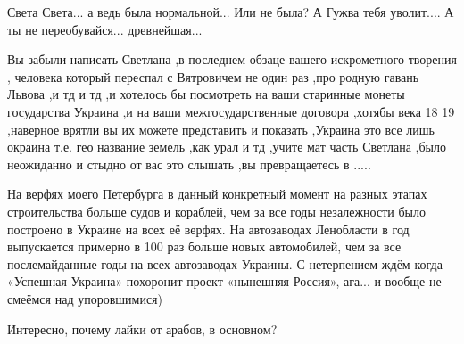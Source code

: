 \begin{itemize}
 

Света Света... а ведь была нормальной... Или не была? А Гужва тебя уволит.... А ты
не переобувайся... древнейшая...


 

Вы забыли написать Светлана ,в последнем обзаце вашего искрометного творения ,
человека который переспал с Вятровичем не один раз ,про родную гавань Львова ,и
тд и тд ,и хотелось бы посмотреть на ваши старинные монеты государства Украина
,и на ваши межгосударственные договора ,хотябы века 18 19 ,наверное врятли вы
их можете представить и показать ,Украина это все лишь окраина т.е. гео
название земель ,как урал и тд ,учите мат часть Светлана ,было неожиданно и
стыдно от вас это слышать ,вы превращаетесь в .....


 

На верфях моего Петербурга в данный конкретный момент на разных этапах
строительства больше судов и кораблей, чем за все годы незалежности было
построено в Украине на всех её верфях. На автозаводах Ленобласти в год
выпускается примерно в 100 раз больше новых автомобилей, чем за все
послемайданные годы на всех автозаводах Украины. С нетерпением ждём когда
«Успешная Украина» похоронит проект «нынешняя Россия», ага... и вообще не
смеёмся над упоровшимися)

 
Интересно, почему лайки от арабов, в основном?

 


\end{itemize}
